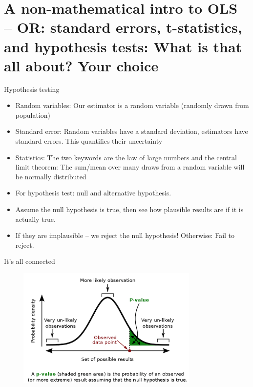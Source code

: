 \documentclass[11pt]{beamer}
\begin{document}
\section[OLS or hypothesis tests: Your choice]{A non-mathematical intro to OLS -- OR: standard errors, t-statistics, and hypothesis tests: What is that all about? \alert{Your choice}}



\begin{frame}{Hypothesis testing}
\begin{itemize}
    \item \alert{Random variables}: Our estimator is a random variable (randomly drawn from population) 
    \item \alert{Standard error}: Random variables have a standard deviation, estimators have standard errors. This quantifies their uncertainty 
    \item \alert{Statistics}: The two keywords are the law of large numbers and the central limit theorem: The sum/mean over many draws from a random variable will be normally distributed
    \item \alert{For hypothesis test}: null and alternative hypothesis. 
    \item Assume the null hypothesis is true, then see \alert{how plausible results are} if it is actually true. 
    \item If they are implausible -- we \alert{reject the null hypothesis}! Otherwise: Fail to reject.
    \end{itemize}
\end{frame}


\begin{frame}{It's all connected}

   \begin{figure}
        \centering
        \includegraphics[width=0.8\textwidth]{figures/hypothesis testing/p_value.png}
        
    \end{figure}


\end{frame}
\end{document}
